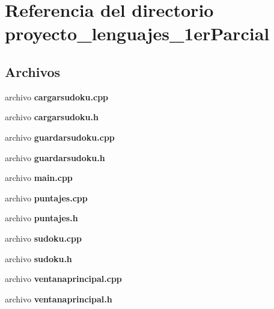 \section{Referencia del directorio proyecto\-\_\-lenguajes\-\_\-1er\-Parcial}
\label{dir_cfbb6dd53c94d0b5b3722af8fdf437ba}
\subsection*{Archivos}
\begin{DoxyCompactItemize}
\item 
archivo {\bf cargarsudoku.\-cpp}
\item 
archivo {\bf cargarsudoku.\-h}
\item 
archivo {\bf guardarsudoku.\-cpp}
\item 
archivo {\bf guardarsudoku.\-h}
\item 
archivo {\bf main.\-cpp}
\item 
archivo {\bf puntajes.\-cpp}
\item 
archivo {\bf puntajes.\-h}
\item 
archivo {\bf sudoku.\-cpp}
\item 
archivo {\bf sudoku.\-h}
\item 
archivo {\bf ventanaprincipal.\-cpp}
\item 
archivo {\bf ventanaprincipal.\-h}
\end{DoxyCompactItemize}
